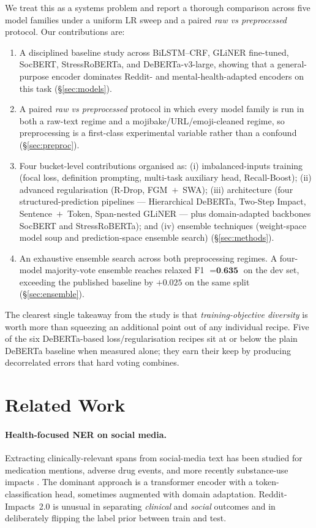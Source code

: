 \documentclass[11pt]{article}
\begin{document}
We treat this as a systems problem and report a thorough comparison across
five model families under a uniform LR sweep and a paired \emph{raw vs
preprocessed} protocol. Our contributions are:

\begin{enumerate}
\itemsep0em
\item A disciplined baseline study across BiLSTM--CRF, GLiNER
fine-tuned, SocBERT, StressRoBERTa, and DeBERTa-v3-large, showing that a
general-purpose encoder dominates Reddit- and mental-health-adapted
encoders on this task (\S\ref{sec:models}).
\item A paired \emph{raw vs preprocessed} protocol in which every model
family is run in both a raw-text regime and a mojibake/URL/emoji-cleaned
regime, so preprocessing is a first-class experimental variable rather
than a confound (\S\ref{sec:preproc}).
\item Four bucket-level contributions organised as:
(i) imbalanced-inputs training (focal loss, definition prompting,
multi-task auxiliary head, Recall-Boost);
(ii) advanced regularisation (R-Drop, FGM~$+$~SWA);
(iii) architecture (four structured-prediction pipelines
--- Hierarchical DeBERTa, Two-Step Impact, Sentence~$+$~Token,
Span-nested GLiNER --- plus domain-adapted backbones SocBERT and
StressRoBERTa); and
(iv) ensemble techniques (weight-space model soup and
prediction-space ensemble search)
(\S\ref{sec:methods}).
\item An exhaustive ensemble search across both preprocessing regimes. A
four-model majority-vote ensemble reaches relaxed F1 $= \textbf{0.635}$ on
the dev set, exceeding the published baseline by $+0.025$ on the same
split (\S\ref{sec:ensemble}).
\end{enumerate}

The clearest single takeaway from the study is that \emph{training-objective
diversity} is worth more than squeezing an additional point out of any
individual recipe. Five of the six DeBERTa-based loss/regularisation
recipes sit at or below the plain DeBERTa baseline when measured alone;
they earn their keep by producing decorrelated errors that hard voting
combines.

\section{Related Work}
\label{sec:related}

\paragraph{Health-focused NER on social media.}
Extracting clinically-relevant spans from social-media text has been
studied for medication mentions, adverse drug events, and more recently
substance-use impacts \citep{sarker2019social,weissenbacher2022overview,
dey2025reddit}. The dominant approach is a transformer encoder with a
token-classification head, sometimes augmented with domain adaptation.
Reddit-Impacts~2.0 \citep{dey2025reddit} is unusual in separating
\emph{clinical} and \emph{social} outcomes and in deliberately flipping
the label prior between train and test.
\end{document}
